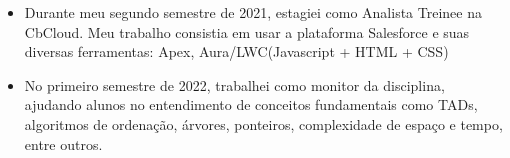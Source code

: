 \documentclass[10pt,a4paper,ragged2e]{altacv}
\begin{document}
{}
\begin{itemize}
\item Durante meu segundo semestre de 2021, estagiei como Analista Treinee na CbCloud. Meu trabalho consistia em usar a 
plataforma Salesforce e suas diversas ferramentas: Apex, Aura/LWC(Javascript + HTML + CSS) 
\end{itemize}
\begin{itemize}
\item No primeiro semestre de 2022, trabalhei como monitor da disciplina, ajudando alunos no 
entendimento de conceitos fundamentais como TADs, algoritmos de ordenação, árvores, ponteiros, 
complexidade de espaço e tempo, entre outros.
\end{itemize}

\divider



\end{document}
